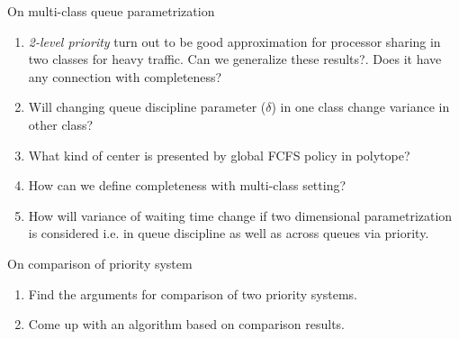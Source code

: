 \documentclass[compress, serif, onlymath, professionalfonts]{beamer}
\begin{document}
\begin{frame}
\begin{block}{On multi-class queue parametrization}
\begin{enumerate}\small
\item \textit{2-level priority} turn out to be good approximation for processor sharing in two classes for heavy traffic.  Can we generalize these results?. Does it have any connection with completeness?
\item Will changing queue discipline parameter ($\delta$) in one class change variance in other class?
\item What kind of center is presented by global FCFS policy in polytope? 
\item How can we define completeness with multi-class setting?
\item How will variance of waiting time change if two dimensional parametrization is considered i.e. in queue discipline as well as across queues via priority.
\end{enumerate}
\end{block}

\begin{block}{On comparison of priority system }
\begin{enumerate}
\item Find the arguments for comparison of two priority systems. 
\item Come up with an algorithm based on comparison results. 
\end{enumerate}
\end{block}
\end{frame}
%
%
\end{document}
